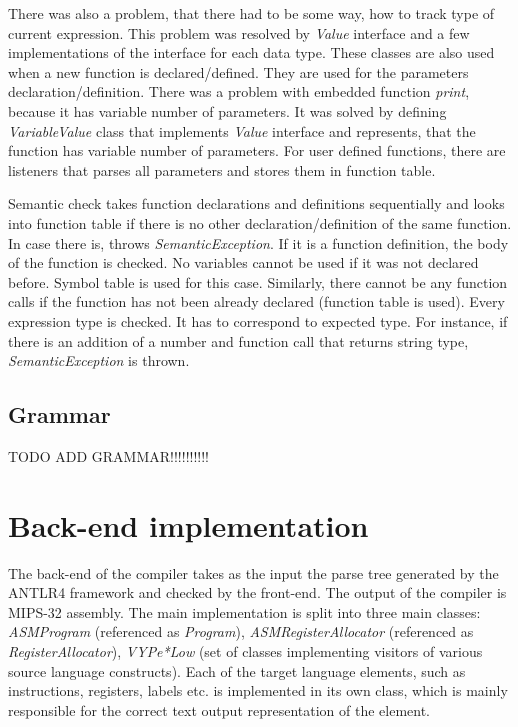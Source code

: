 There was also a problem, that there had to be some way, how to track type of current expression. This problem was resolved by \textit{Value} interface and a few implementations of the interface for each data type. These classes are also used when a new function is declared/defined. They are used for the parameters declaration/definition. There was a problem with embedded function \textit{print}, because it has variable number of parameters. It was solved by defining \textit{VariableValue} class that implements \textit{Value} interface and represents, that the function has variable number of parameters. For user defined functions, there are listeners that parses all parameters and stores them in function table.

Semantic check takes function declarations and definitions sequentially and looks into function table if there is no other declaration/definition of the same function. In case there is, throws \textit{SemanticException}. If it is a function definition, the body of the function is checked. No variables cannot be used if it was not declared before. Symbol table is used for this case. Similarly, there cannot be any function calls if the function has not been already declared (function table is used). Every expression type is checked. It has to correspond to expected type. For instance, if there is an addition of a number and function call that returns string type, \textit{SemanticException} is thrown. 


 

\subsection{Grammar}
\label{sec:grammar}

TODO ADD GRAMMAR!!!!!!!!!!

\section{Back-end implementation}
The back-end of the compiler takes as the input the parse tree generated by the ANTLR4 framework and checked by the front-end. The output of the compiler is MIPS-32 assembly. The main implementation is split into three main classes: \textit{ASMProgram} (referenced as \textit{Program}), \textit{ASMRegisterAllocator} (referenced as \textit{RegisterAllocator}), \textit{VYPe*Low} (set of classes implementing visitors of various source language constructs). Each of the target language elements, such as instructions, registers, labels etc. is implemented in its own class, which is mainly responsible for the correct text output representation of the element.

